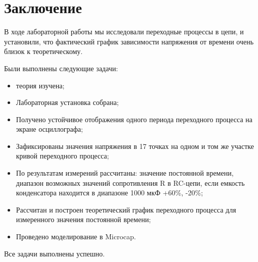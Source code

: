 \chapter*{Заключение}
\label{ch:concl}

В ходе лабораторной работы мы исследовали переходные процессы в цепи, и установили, что фактический график зависимости напряжения от времени очень близок к теоретическому.

Были выполнены следующие задачи:
\begin{itemize}
    \item теория изучена;
    \item Лабораторная установка собрана;
    \item Получено устойчивое отображения одного периода переходного процесса на экране осциллографа;
    \item Зафиксированы значения напряжения в 17 точках на одном и том же участке кривой переходного процесса;
    \item По результатам измерений рассчитаны: значение постоянной времени, диапазон возможных значений сопротивления R в RC-цепи, если емкость конденсатора находится в диапазоне 1000 мкФ +60\%, -20\%;
    \item Рассчитан и построен теоретический график переходного процесса для измеренного значения постоянной времени;
    \item Проведено моделирование в Microcap.

\end{itemize}
Все задачи выполнены успешно.

\endinput